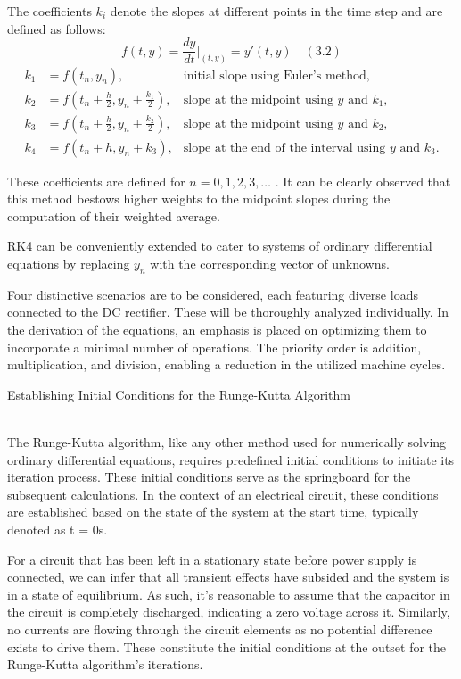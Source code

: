 The coefficients $k_i$ denote the slopes at different points in the time step and are defined as follows:
\begin{equation}
f(t, y) = \frac{dy}{dt}\bigg|_{(t, y)} = y'(t, y) \quad (3.2)
\end{equation}
\begin{align*}
k_1 &= f(t_n, y_n), &\text{initial slope using Euler's method},\\
k_2 &= f \left(t_n + \frac{h}{2}, y_n + \frac{k_1}{2}\right), &\text{slope at the midpoint using $y$ and $k_1$},\\
k_3 &= f \left(t_n + \frac{h}{2}, y_n + \frac{k_2}{2}\right), &\text{slope at the midpoint using $y$ and $k_2$},\\
k_4 &= f(t_n + h, y_n + k_3), &\text{slope at the end of the interval using $y$ and $k_3$}.
\end{align*}

These coefficients are defined for $n = 0, 1, 2, 3, \ldots$ . It can be clearly observed that this method bestows higher weights to the midpoint slopes during the computation of their weighted average.

RK4 can be conveniently extended to cater to systems of ordinary differential equations by replacing $y_n$ with the corresponding vector of unknowns.

Four distinctive scenarios are to be considered, each featuring diverse loads connected to the DC rectifier. These will be thoroughly analyzed individually. In the derivation of the equations, an emphasis is placed on optimizing them to incorporate a minimal number of operations. The priority order is addition, multiplication, and division, enabling a reduction in the utilized machine cycles.

\begin{center}
\Large Establishing Initial Conditions for the Runge-Kutta Algorithm
\end{center}\\

The Runge-Kutta algorithm, like any other method used for numerically solving ordinary differential equations, requires predefined initial conditions to initiate its iteration process. These initial conditions serve as the springboard for the subsequent calculations. In the context of an electrical circuit, these conditions are established based on the state of the system at the start time, typically denoted as t = 0s.

For a circuit that has been left in a stationary state before power supply is connected, we can infer that all transient effects have subsided and the system is in a state of equilibrium. As such, it's reasonable to assume that the capacitor in the circuit is completely discharged, indicating a zero voltage across it. Similarly, no currents are flowing through the circuit elements as no potential difference exists to drive them. These constitute the initial conditions at the outset for the Runge-Kutta algorithm's iterations.

